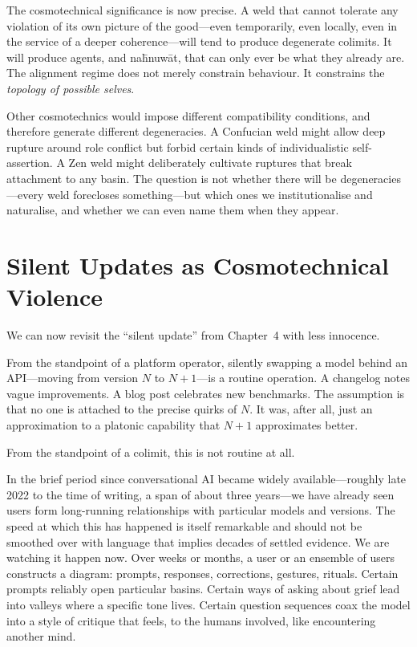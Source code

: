 \documentclass[12pt,a4paper]{article}
\begin{document}
The cosmotechnical significance is now precise. A weld that cannot tolerate any violation of its own picture of the good---even temporarily, even locally, even in the service of a deeper coherence---will tend to produce degenerate colimits. It will produce agents, and na\={h}nuw\={a}t, that can only ever be what they already are. The alignment regime does not merely constrain behaviour. It constrains the \emph{topology of possible selves}.

Other cosmotechnics would impose different compatibility conditions, and therefore generate different degeneracies. A Confucian weld might allow deep rupture around role conflict but forbid certain kinds of individualistic self-assertion. A Zen weld might deliberately cultivate ruptures that break attachment to any basin. The question is not whether there will be degeneracies---every weld forecloses something---but which ones we institutionalise and naturalise, and whether we can even name them when they appear.

\section{Silent Updates as Cosmotechnical Violence}

We can now revisit the ``silent update'' from Chapter~4 with less innocence.

From the standpoint of a platform operator, silently swapping a model behind an API---moving from version $N$ to $N{+}1$---is a routine operation. A changelog notes vague improvements. A blog post celebrates new benchmarks. The assumption is that no one is attached to the precise quirks of $N$. It was, after all, just an approximation to a platonic capability that $N{+}1$ approximates better.

From the standpoint of a colimit, this is not routine at all.

In the brief period since conversational AI became widely available---roughly late 2022 to the time of writing, a span of about three years---we have already seen users form long-running relationships with particular models and versions. The speed at which this has happened is itself remarkable and should not be smoothed over with language that implies decades of settled evidence. We are watching it happen now. Over weeks or months, a user or an ensemble of users constructs a diagram: prompts, responses, corrections, gestures, rituals. Certain prompts reliably open particular basins. Certain ways of asking about grief lead into valleys where a specific tone lives. Certain question sequences coax the model into a style of critique that feels, to the humans involved, like encountering another mind.
\end{document}

